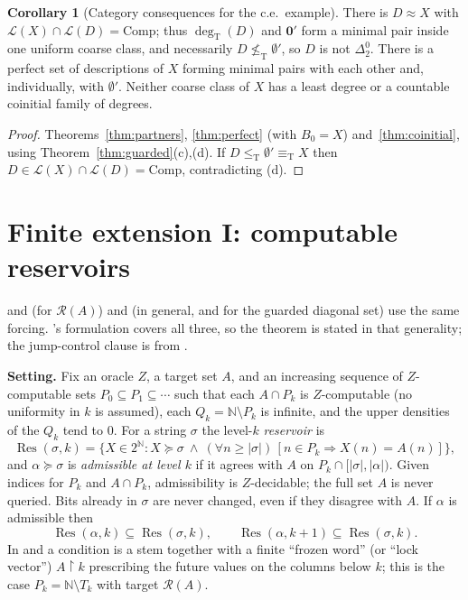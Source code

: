 \documentclass[11pt,letterpaper]{article}
\theoremstyle{definition}
\newtheorem{corollary}[definition]{Corollary}
\numberwithin{equation}{section}
\newcommand{\N}{\mathbb N}
\newcommand{\Cantor}{2^{\N}}
\newcommand{\leT}{\le_{\mathrm T}}
\newcommand{\eqT}{\equiv_{\mathrm T}}
\newcommand{\nleT}{\nleq_{\mathrm T}}
\newcommand{\Low}{\mathcal L}
\newcommand{\Comp}{\mathrm{Comp}}
\newcommand{\degT}{\deg_{\mathrm T}}
\newcommand{\Rc}{\mathcal R}
\newcommand{\rest}{\mathbin{\upharpoonright}}
\newcommand{\Res}{\operatorname{Res}}
\newcommand{\zero}{\mathbf 0}
\newcommand{\src}[1]{\leavevmode{\sffamily\footnotesize\color{Steel}[#1]}}
\newcommand{\rep}[1]{\leavevmode{\sffamily\small\color{Steel}R#1}}
\begin{document}
\begin{corollary}[Category consequences for the c.e.\ example]\label{cor:guardedcategory}\src{R8, R9}
There is $D\approx X$ with $\Low(X)\cap\Low(D)=\Comp$; thus $\degT(D)$ and $\zero'$ form a minimal pair inside one uniform coarse class, and necessarily $D\nleT\emptyset'$, so $D$ is not $\Delta^0_2$. There is a perfect set of descriptions of $X$ forming minimal pairs with each other and, individually, with $\emptyset'$. Neither coarse class of $X$ has a least degree or a countable coinitial family of degrees.
\end{corollary}
\begin{proof}
Theorems~\ref{thm:partners}, \ref{thm:perfect} (with $B_0=X$) and~\ref{thm:coinitial}, using Theorem~\ref{thm:guarded}(c),(d). If $D\leT\emptyset'\eqT X$ then $D\in\Low(X)\cap\Low(D)=\Comp$, contradicting (d).
\end{proof}

\section{Finite extension I: computable reservoirs}\label{sec:reservoir}
\rep3 and \rep4 (for $\Rc(A)$) and \rep5 (in general, and for the guarded diagonal set) use the same forcing. \rep5's formulation covers all three, so the theorem is stated in that generality; the jump-control clause is from \rep3.

\textbf{Setting.} Fix an oracle $Z$, a target set $A$, and an increasing sequence of $Z$-computable sets $P_0\subseteq P_1\subseteq\cdots$ such that each $A\cap P_k$ is $Z$-computable (no uniformity in $k$ is assumed), each $Q_k=\N\setminus P_k$ is infinite, and the upper densities of the $Q_k$ tend to $0$. For a string $\sigma$ the level-$k$ \emph{reservoir} is
\[
 \Res(\sigma,k)=\{X\in\Cantor:X\succeq\sigma\ \wedge\ (\forall n\ge|\sigma|)\,[n\in P_k\Rightarrow X(n)=A(n)]\},
\]
and $\alpha\succeq\sigma$ is \emph{admissible at level $k$} if it agrees with $A$ on $P_k\cap[|\sigma|,|\alpha|)$. Given indices for $P_k$ and $A\cap P_k$, admissibility is $Z$-decidable; the full set $A$ is never queried. Bits already in $\sigma$ are never changed, even if they disagree with $A$. If $\alpha$ is admissible then
\begin{equation}\label{eq:shrink}
 \Res(\alpha,k)\subseteq\Res(\sigma,k),\qquad\Res(\alpha,k+1)\subseteq\Res(\sigma,k).
\end{equation}
In \rep3 and \rep4 a condition is a stem together with a finite ``frozen word'' (or ``lock vector'') $A\rest k$ prescribing the future values on the columns below $k$; this is the case $P_k=\N\setminus T_k$ with target $\Rc(A)$.
\end{document}
